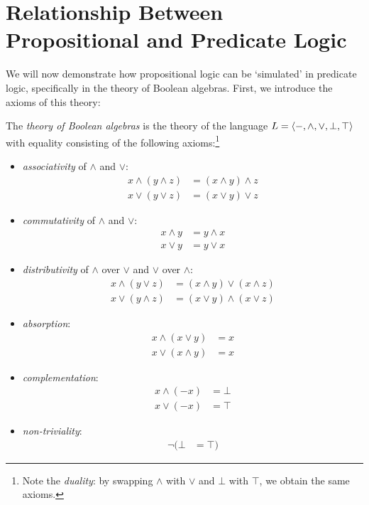 \section{Relationship Between Propositional and Predicate Logic}
\label{section:relationship-propositional-predicate-logic}

We will now demonstrate how propositional logic can be `simulated' in predicate logic, specifically in the theory of Boolean algebras. First, we introduce the axioms of this theory:

\begin{definition}
    The \emph{theory of Boolean algebras} is the theory of the language $L=\langle -,{\land},{\lor},\bot,\top\rangle$ with equality consisting of the following axioms:\footnote{Note the \emph{duality}: by swapping $\land$ with $\lor$ and $\bot$ with $\top$, we obtain the same axioms.}
    \begin{multicols}{2}
        \begin{itemize}
            \item \emph{associativity} of $\land$ and $\lor$:
            \begin{align*}
                x\land(y\land z) &=(x\land y)\land z\\
                x\lor(y\lor z) &=(x\lor y)\lor z
            \end{align*}
            \item \emph{commutativity} of $\land$ and $\lor$:
            \begin{align*}
                x\land y &= y\land x\\
                x\lor y &= y\lor x
            \end{align*}
            \item \emph{distributivity} of $\land$ over $\lor$ and $\lor$ over $\land$:
            \begin{align*}
                x\land(y\lor z) &= (x\land y)\lor (x\land z)\\
                x\lor(y\land z) &= (x\lor y)\land (x\lor z)
            \end{align*}
            \item \emph{absorption}:
            \begin{align*}
                x\land(x\lor y) &= x\\
                x\lor(x\land y) &= x
            \end{align*}
            \item \emph{complementation}:
            \begin{align*}
                x\land(-x) &= \bot \\
                x\lor(-x) &= \top
            \end{align*}
            \item \emph{non-triviality}:
            \begin{align*}
                \neg (\bot &= \top)
            \end{align*}

        \end{itemize}
    \end{multicols}    
\end{definition}

